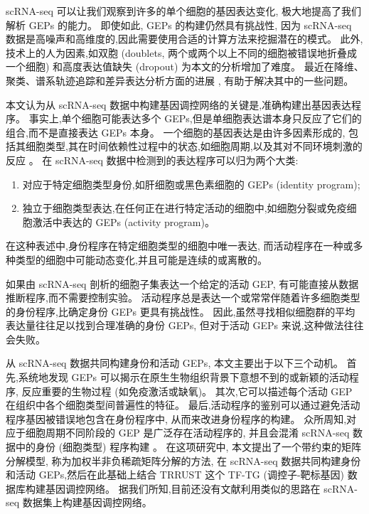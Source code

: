 scRNA-seq 可以让我们观察到许多的单个细胞的基因表达变化,
极大地提高了我们解析 GEPs 的能力。
即使如此, GEPs 的构建仍然具有挑战性,
因为 scRNA-seq 数据是高噪声和高维度的,因此需要使用合适的计算方法来挖掘潜在的模式。
此外,技术上的人为因素,如双胞 (doublets, 两个或两个以上不同的细胞被错误地折叠成一个细胞) 和高度表达值缺失 (dropout) 为本文的分析增加了难度。
最近在降维、聚类、谱系轨迹追踪和差异表达分析方面的进展 ,
有助于解决其中的一些问题。

本文认为从 scRNA-seq 数据中构建基因调控网络的关键是,准确构建出基因表达程序。
事实上,单个细胞可能表达多个 GEPs,但是单细胞表达谱本身只反应了它们的组合,而不是直接表达 GEPs 本身。
一个细胞的基因表达是由许多因素形成的,
包括其细胞类型,其在时间依赖性过程中的状态,如细胞周期,以及其对不同环境刺激的反应 。
在 scRNA-seq 数据中检测到的表达程序可以归为两个大类:
\begin{enumerate}[label=(\arabic*),itemindent=2em]
    \item 对应于特定细胞类型身份,如肝细胞或黑色素细胞的 GEPs (identity program);
    \item 独立于细胞类型表达,在任何正在进行特定活动的细胞中,如细胞分裂或免疫细胞激活中表达的 GEPs (activity program)。
\end{enumerate}
在这种表述中,身份程序在特定细胞类型的细胞中唯一表达,
而活动程序在一种或多种类型的细胞中可能动态变化,并且可能是连续的或离散的。

如果由 scRNA-seq 剖析的细胞子集表达一个给定的活动 GEP,
有可能直接从数据推断程序,而不需要控制实验。
活动程序总是表达一个或常常伴随着许多细胞类型的身份程序,比确定身份 GEPs 更具有挑战性。
因此,虽然寻找相似细胞群的平均表达量往往足以找到合理准确的身份 GEPs,
但对于活动 GEPs 来说,这种做法往往会失败。

从 scRNA-seq 数据共同构建身份和活动 GEPs, 本文主要出于以下三个动机。
首先,系统地发现 GEPs 可以揭示在原生生物组织背景下意想不到的或新颖的活动程序,
反应重要的生物过程 (如免疫激活或缺氧)。
其次,它可以描述每个活动 GEP 在组织中各个细胞类型间普遍性的特征。
最后,活动程序的鉴别可以通过避免活动程序基因被错误地包含在身份程序中, 从而来改进身份程序的构建。
众所周知,对应于细胞周期不同阶段的 GEP 是广泛存在活动程序的,
并且会混淆 scRNA-seq 数据中的身份 (细胞类型) 程序构建 。
在这项研究中, 本文提出了一个带约束的矩阵分解模型, 称为加权半非负稀疏矩阵分解的方法,
在 scRNA-seq 数据共同构建身份和活动 GEPs,然后在此基础上结合 TRRUST 这个 TF-TG (调控子-靶标基因) 数据库构建基因调控网络。
据我们所知,目前还没有文献利用类似的思路在 scRNA-seq 数据集上构建基因调控网络。

